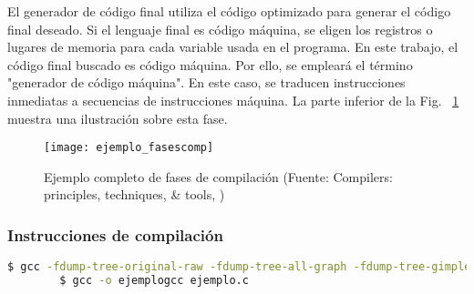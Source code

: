     El generador de código final utiliza el código optimizado para generar el código final deseado.
    Si el lenguaje final es código máquina, se eligen los registros o lugares de memoria para
    cada variable usada en el programa. 
    En este trabajo, el código final buscado es código máquina. Por ello, se empleará el término "generador de código máquina".
    En este caso, se traducen instrucciones inmediatas a secuencias de instrucciones máquina.
    La parte inferior de la Fig. ~\ref{fig:fasesEjemplo} muestra una ilustración sobre esta fase.

    \begin{figure}[p]
        \begingroup
            \centering
                \texttt{[image: ejemplo\_fasescomp]}
                \caption{Ejemplo completo de fases de compilación (Fuente: Compilers: principles, techniques, \& tools, \cite{aho_compilers:_2007}) }
                \label{fig:fasesEjemplo}
            \par
        \endgroup
    \end{figure}

\subsubsection{Instrucciones de compilación}

    \begin{lstlisting}[label=comandoC, caption= Comando de compilación del archivo \texttt{ejemplo.c} \cite{repo_trabajo_codigofuente} para GCC., language=bash]
        $ gcc -fdump-tree-original-raw -fdump-tree-all-graph -fdump-tree-gimple -da -S ejemplo.c 
        $ gcc -o ejemplogcc ejemplo.c \end{lstlisting}